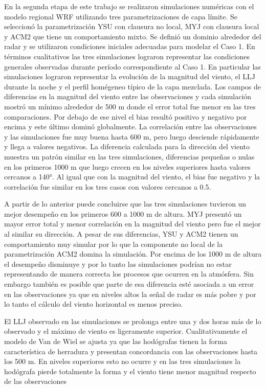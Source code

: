 \documentclass[12pt,spanish,oneside, a4paper]{book}
\begin{document}
En la segunda etapa de este trabajo se realizaron simulaciones numéricas
con el modelo regional WRF utilizando tres parametrizaciones de capa
límite. Se seleccionó la parametrización YSU con clausura no local, MYJ
con clausura local y ACM2 que tiene un comportamiento mixto. Se definió
un dominio alrededor del radar y se utilizaron condiciones iniciales
adecuadas para modelar el Caso 1. En términos cualitativos las tres
simulaciones lograron representar las condiciones generales observadas
durante período correspondiente al Caso 1. En particular las
simulaciones lograron representar la evolución de la magnitud del
viento, el LLJ durante la noche y el perfil homégeneo típico de la capa
mezclada. Los campos de diferencias en la magnitud del viento entre las
observaciones y cada simulación mostró un mínimo alrededor de 500 m
donde el error total fue menor en las tres comparaciones. Por debajo de
ese nivel el bias resultó positivo y negativo por encima y este último
dominó globalmente. La correlación entre las observaciones y las
simulaciones fue muy buena hasta 600 m, pero luego desciende rápidamente
y llega a valores negativos. La diferencia calculada para la dirección
del viento muestra un patrón similar en las tres simulaciones,
diferencias pequeñas o nulas en los primeros 1000 m que luego crecen en
los niveles superiores hasta valores cercanos a 140°. Al igual que con
la magnitud del viento, el bias fue negativo y la correlación fue
similar en los tres casos con valores cercanos a 0.5.

A partir de lo anterior puede concluirse que las tres simulaciones
tuvieron un mejor desempeño en los primeros 600 a 1000 m de altura. MYJ
presentó un mayor error total y menor correlación en la magnitud del
viento pero fue el mejor al similar su dirección. A pesar de sus
diferencias, YSU y ACM2 tienen un comportamiento muy simular por lo que
la componente no local de la parametrización ACM2 domina la simulación.
Por encima de los 1000 m de altura el desempeño disminuye y por lo tanto
las simulaciones podrían no estar representando de manera correcta los
procesos que ocurren en la atmósfera. Sin embargo también es posible que
parte de esa diferencia esté asociada a un error en las observaciones ya
que en niveles altos la señal de radar es más pobre y por lo tanto el
cálculo del viento horizontal es menos preciso.

El LLJ observado en las simulaciones se prolonga entre una y dos horas
más de lo observado y el máximo de viento es ligeramente superior.
Cualitativamente el modelo de Van de Wiel se ajusta ya que las
hodógrafas tienen la forma característica de herradura y presentan
concordancia con las observaciones hasta los 500 m. En niveles
superiores esto no ocurre y en las tres simulaciones la hodógrafa pierde
totalmente la forma y el viento tiene menor magnitud respecto de las
observaciones
\end{document}
